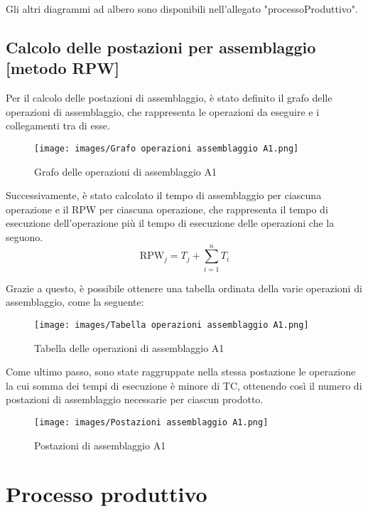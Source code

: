 \documentclass[11pt]{article}
\begin{document}
\noindent
Gli altri diagrammi ad albero sono disponibili nell'allegato "{{processoProduttivo}}".
\newpage

\subsection{Calcolo delle postazioni per assemblaggio [metodo RPW]}
Per il calcolo delle postazioni di assemblaggio, è stato definito il grafo delle operazioni di assemblaggio, che rappresenta le operazioni da eseguire e i collegamenti tra di esse.
\begin{figure} [H]
    \centering
    \texttt{[image: images/Grafo operazioni assemblaggio A1.png]}
    \caption{Grafo delle operazioni di assemblaggio A1}
    \label{fig: Grafo delle operazioni di assemblaggio A1}
\end{figure}

Successivamente, è stato calcolato il tempo di assemblaggio per ciascuna operazione e il RPW per ciascuna operazione, che rappresenta il tempo di esecuzione dell'operazione più il tempo di esecuzione delle operazioni che la seguono.
\begin{equation}
    \text{RPW}_j = T_j + \sum_{i=1}^{n} T_i
\end{equation}

Grazie a questo, è possibile ottenere una tabella ordinata della varie operazioni di assemblaggio, come la seguente:
\begin{figure} [H]
    \centering
    \texttt{[image: images/Tabella operazioni assemblaggio A1.png]}
    \caption{Tabella delle operazioni di assemblaggio A1}
    \label{fig: Tabella delle operazioni di assemblaggio A1}
\end{figure}

Come ultimo passo, sono state raggruppate nella stessa postazione le operazione la cui somma dei tempi di esecuzione è minore di TC, ottenendo così il numero di postazioni di assemblaggio necessarie per ciascun prodotto.
\begin{figure} [H]
    \centering
    \texttt{[image: images/Postazioni assemblaggio A1.png]}
    \caption{Postazioni di assemblaggio A1}
    \label{fig: Postazioni di assemblaggio A1}
\end{figure}

\newpage


\section{Processo produttivo}
\end{document}
